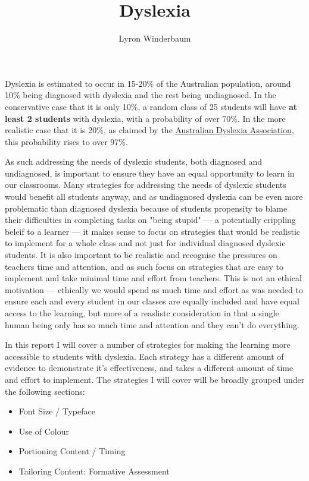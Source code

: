 \documentclass[12pt]{article}
\title{Dyslexia}
\author{Lyron Winderbaum}
\begin{document}
\maketitle



Dyslexia is estimated to occur in 15-20\% of the Australian population, around 10\% being diagnosed with dyslexia and the rest being undiagnosed. In the conservative case that it is only 10\%, a random class of 25 students will have \textbf{at least 2 students} with dyslexia, with a probability of over 70\%. In the more realistic case that it is 20\%, as claimed by the \href{https://dyslexiaassociation.org.au/dyslexia-in-australia/}{Australian Dyslexia Association}, this probability rises to over 97\%. 

As such addressing the needs of dyslexic students, both diagnosed and undiagnosed, is important to ensure they have an equal opportunity to learn in our classrooms. Many strategies for addressing the needs of dyslexic students would benefit all students anyway, and as undiagnosed dyslexia can be even more problematic than diagnosed dyslexia because of students propensity to blame their difficulties in completing tasks on "being stupid" --- a potentially crippling beleif to a learner --- it makes sense to focus on strategies that would be realistic to implement for a whole class and not just for individual diagnosed dyslexic students. It is also important to be realistic and recognise the pressures on teachers time and attention, and as such focus on strategies that are easy to implement and take minimal time and effort from teachers. This is not an ethical motivation --- ethically we would spend as much time and effort as was needed to ensure each and every student in our classes are equally included and have equal access to the learning, but more of a reaslistc consideration in that a single human being only has so much time and attention and they can't do everything.

In this report I will cover a number of strategies for making the learning more accessible to students with dyslexia. Each strategy has a different amount of evidence to demonstrate it's effectiveness, and takes a different amount of time and effort to implement. The strategies I will cover will be broadly grouped under the following sections:
\begin{itemize}
	\item Font Size / Typeface
	\item Use of Colour
	\item Portioning Content / Timing
	\item Tailoring Content: Formative Assessment
\end{itemize}
\end{document}
